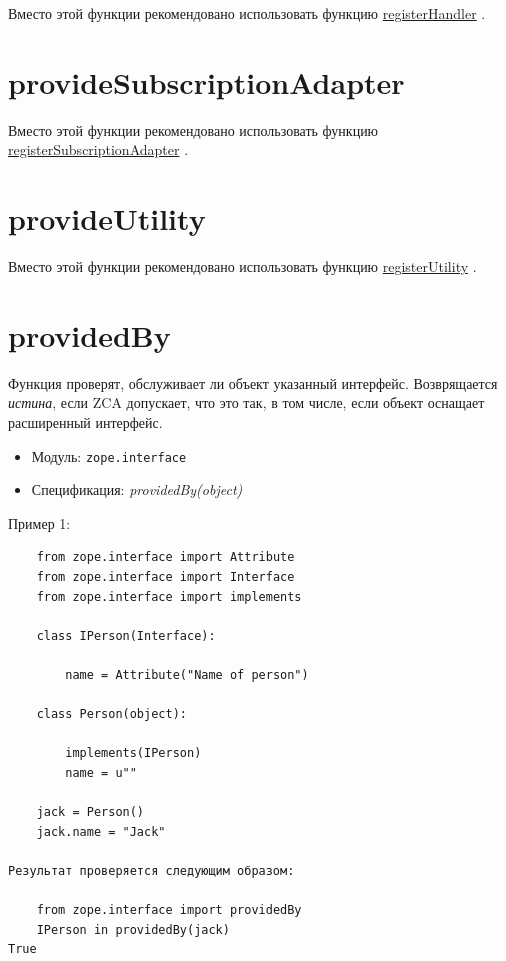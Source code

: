 \documentclass[a4paper,openany,twoside,draft]{book}
\providecommand*{\DUroletitlereference}[1]{\textsl{#1}}
\begin{document}
Вместо этой функции рекомендовано использовать функцию \hyperref[registerhandler]{registerHandler} .


\section*{provideSubscriptionAdapter%
  \label{providesubscriptionadapter}%
}

Вместо этой функции рекомендовано использовать функцию \hyperref[registersubscriptionadapter]{registerSubscriptionAdapter} .


\section*{provideUtility%
  \label{provideutility}%
}

Вместо этой функции рекомендовано использовать функцию \hyperref[registerutility]{registerUtility} .


\section*{providedBy%
  \label{providedby}%
}

Функция проверят, обслуживает ли объект указанный интерфейс.  Возврящается \DUroletitlereference{истина}, если ZCA допускает, что это так, в том числе, если объект оснащает расширенный интерфейс.

\begin{itemize}

\item Модуль: \texttt{zope.interface}

\item Спецификация: \DUroletitlereference{providedBy(object)}

\end{itemize}

Пример 1:

\begin{verbatim}
    from zope.interface import Attribute
    from zope.interface import Interface
    from zope.interface import implements

    class IPerson(Interface):

        name = Attribute("Name of person")

    class Person(object):

        implements(IPerson)
        name = u""

    jack = Person()
    jack.name = "Jack"

Результат проверяется следующим образом:

    from zope.interface import providedBy
    IPerson in providedBy(jack)
True
\end{verbatim}
\end{document}
